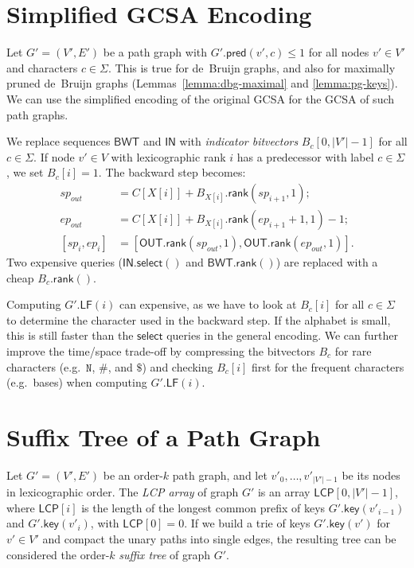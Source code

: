 \documentclass[twoside,leqno,twocolumn]{article}
\newcommand{\abs}[1]{\ensuremath{\lvert #1 \rvert}}
\newcommand{\baseN}{\mathtt{N}}
\newcommand{\rank}{\ensuremath{\mathsf{rank}}}
\newcommand{\select}{\ensuremath{\mathsf{select}}}
\newcommand{\LF}{\ensuremath{\mathsf{LF}}}
\newcommand{\gpred}{\ensuremath{\mathsf{pred}}}
\newcommand{\gkey}{\ensuremath{\mathsf{key}}}
\newcommand{\orderk}[1]{order\nobreakdash-$#1$}
\newcommand{\BWT}{\ensuremath{\mathsf{BWT}}}
\newcommand{\LCP}{\ensuremath{\mathsf{LCP}}}
\newcommand{\bvIN}{\ensuremath{\mathsf{IN}}}
\newcommand{\bvOUT}{\ensuremath{\mathsf{OUT}}}
\begin{document}
\section{Simplified GCSA Encoding}\label{appendix:encoding}

Let $G' = (V', E')$ be a path graph with $G'.\gpred(v', c) \le 1$ for all nodes $v' \in V'$ and characters $c \in \Sigma$. This is true for de~Bruijn graphs, and also for maximally pruned de~Bruijn graphs (Lemmas~\ref{lemma:dbg-maximal} and \ref{lemma:pg-keys}). We can use the simplified encoding of the original GCSA \cite{Siren2014} for the GCSA of such path graphs.

We replace sequences $\BWT$ and $\bvIN$ with \emph{indicator bitvectors} $B_{c}[0, \abs{V'}-1]$ for all $c \in \Sigma$. If node $v' \in V$ with lexicographic rank $i$ has a predecessor with label $c \in \Sigma$, we set $B_{c}[i] = 1$. The backward step becomes:
\begin{align*}
sp_{out} & = C[X[i]] + B_{X[i]}.\rank(sp_{i+1}, 1); \\
ep_{out} & = C[X[i]] + B_{X[i]}.\rank(ep_{i+1}+1, 1) - 1; \\
[sp_{i}, ep_{i}] & = [\bvOUT.\rank(sp_{out}, 1), \bvOUT.\rank(ep_{out}, 1)].
\end{align*}
Two expensive queries ($\bvIN.\select()$ and $\BWT.\rank()$) are replaced with a cheap $B_{c}.\rank()$.

Computing $G'.\LF(i)$ can expensive, as we have to look at $B_{c}[i]$ for all $c \in \Sigma$ to determine the character used in the backward step. If the alphabet is small, this is still faster than the $\select$ queries in the general encoding. We can further improve the time/space trade-off by compressing the bitvectors $B_{c}$ for rare characters (e.g.~$\baseN$, $\#$, and $\$$) and checking $B_{c}[i]$ first for the frequent characters (e.g.~bases) when computing $G'.\LF(i)$.


\section{Suffix Tree of a Path Graph}\label{appendix:extensions}

Let $G' = (V', E')$ be an \orderk{k} path graph, and let $v'_{0}, \dotsc, v'_{\abs{V'}-1}$ be its nodes in lexicographic order. The \emph{LCP array} of graph $G'$ is an array $\LCP[0, \abs{V'}-1]$, where $\LCP[i]$ is the length of the longest common prefix of keys $G'.\gkey(v'_{i-1})$ and $G'.\gkey(v'_{i})$, with $\LCP[0] = 0$. If we build a trie of keys $G'.\gkey(v')$ for $v' \in V'$ and compact the unary paths into single edges, the resulting tree can be considered the \orderk{k} \emph{suffix tree} of graph $G'$.
\end{document}
